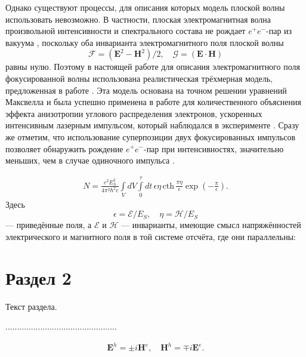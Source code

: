 \documentclass[a4paper,12pt]{article}         %
\begin{document}
Однако существуют процессы, для описания которых модель плоской
волны использовать невозможно. В частности, плоская электромагнитная
волна произвольной интенсивности и спектрального состава не рождает
$e^+ e^-$-пар из вакуума \cite{schwinger}, поскольку оба инварианта
электромагнитного поля плоской волны
\[\mathcal F=(\mathbf E^2-\mathbf H^2)/2,\quad\mathcal G=(\mathbf E\cdot\mathbf H)\]    %
равны нулю. Поэтому в настоящей работе для описания
электромагнитного поля фокусированной волны использована
реалистическая трёхмерная модель, предложенная в работе
\cite{narozhny2}. Эта модель основана на точном решении уравнений
Максвелла и была успешно применена в работе \cite{narozhny3} для
количественного объяснения эффекта анизотропии углового
распределения электронов, ускоренных интенсивным лазерным импульсом,
который наблюдался в эксперименте \cite{malka}. Сразу же отметим,
что использование суперпозиции двух фокусированных импульсов
позволяет обнаружить рождение $e^+ e^-$-пар при интенсивностях,
значительно меньших, чем в случае одиночного импульса
\cite{narozhny4,narozhny5}.

\begin{equation}                %
 \label{pairs}
 \begin{aligned}                %
  N=\frac{e^2E_S^2}{4\pi^2\hbar^2c}\int\limits_{V}dV\int\limits_{0}^{\tau}dt\,
  \epsilon\eta\, \mathrm{cth}\,
  \frac{\pi\eta}{\epsilon}\exp\left(-\frac{\pi}{\epsilon}\right).
 \end{aligned}
\end{equation}
Здесь
$$\epsilon=\mathcal E/E_S,\quad\eta=\mathcal H/E_S$$
--- приведённые поля, а $\mathcal E$ и $\mathcal H$ --- инварианты,
имеющие смысл напряжённостей электрического и магнитного поля в той
системе отсчёта, где они параллельны:

\newpage
\section{Раздел 2}

Текст раздела.

................................................

\begin{equation}
 \begin{aligned}
  \mathbf E^h=\pm i\mathbf H^e,\quad\mathbf H^h=\mp i\mathbf E^e. %
 \end{aligned}
\end{equation}
\end{document}
